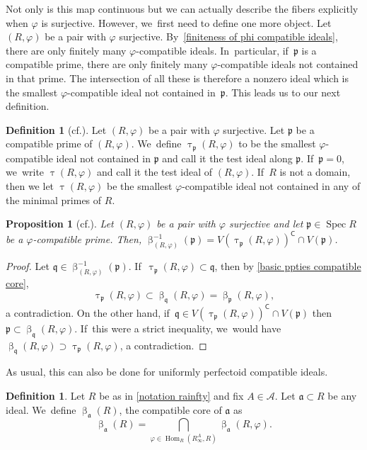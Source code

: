 \documentclass[11pt]{article}
\newcommand{\cf}{cf.\xspace}
\let\autoref\cref
\theoremstyle{plain}
\newtheorem{proposition}[theorem]{Proposition}
\theoremstyle{definition}
\newtheorem{definition}[theorem]{Definition}
\numberwithin{equation}{theorem}
\newcommand{\fra}{\mathfrak{a}}
\newcommand{\p}{\mathfrak{p}}
\newcommand{\q}{\mathfrak{q}}
\DeclareMathOperator{\Hom}{Hom}
\DeclareMathOperator{\Spec}{{Spec}}
\newcommand{\sA}{\mathcal{A}}
\renewcommand{\phi}{\varphi}
\newcommand{\rphi}{(R,\phi)}
\newcommand{\inv}{^{-1}}
\newcommand{\rafty}{R^A_\infty}
\begin{document}
Not only is this map continuous but we can actually describe the fibers explicitly when $\phi$ is surjective. However, we~first need to define one more object.
Let $\rphi$ be a pair with $\phi$ surjective. By~\autoref{finiteness of phi compatible ideals}, there are only finitely many $\phi$-compatible ideals. In~particular, if~$\p$ is a compatible prime, there are only finitely many $\phi$-compatible ideals not contained in that prime. The intersection of all these is therefore a nonzero ideal which is the smallest $\phi$-compatible ideal not contained in~$\p$. This leads us to our next definition.

\begin{definition}[{\cf \cite{TakagiHigherDimensionalAdjoint, SmolkinSubadditivity}}]
Let $\rphi$ be a pair with $\phi$ surjective. Let $\p$ be a compatible prime of $\rphi$. We~define $\uptau_\p\rphi$ to be the smallest $\phi$-compatible ideal not contained in $\p$ and call it the test ideal along $\p$. If~$\p=0$, we~write $\uptau\rphi$ and call it the test ideal of $\rphi$. If~$R$ is not a domain, then we let $\uptau\rphi$ be the smallest $\phi$-compatible ideal not contained in any of the minimal primes of $R$.
\end{definition}

\begin{proposition}[{\cf \cite[Prop.\,4.20]{CarvajalFayolleTameRamificationCFPS}}]\label{beta is locally closed}
Let $\rphi$ be a pair with $\phi$ surjective and let $\p\in \Spec R$ be a $\phi$-compatible prime. Then, $\upbeta\inv_{\rphi}(\p)=V(\uptau_\p\rphi)^\mathsf{C}\cap V(\p)$.
\end{proposition}

\begin{proof}
Let $\q\in \upbeta\inv_{\rphi}(\p)$. If~$\uptau_\p\rphi\subset \q$, then by \autoref{basic ppties compatible core},
\[\uptau_\p\rphi\subset \upbeta_\q\rphi=\upbeta_\p\rphi,\]
a contradiction. On the other hand, if~$\q\in V(\uptau_\p\rphi)^\mathsf{C} \cap V(\p)$ then $\p\subset \upbeta_\q\rphi$. If~this were a strict inequality, we~would have $\upbeta_\q\rphi\supset \uptau_\p\rphi$, a contradiction.
\end{proof}

As usual, this can also be done for uniformly perfectoid compatible ideals.

\begin{definition}
Let $R$ be as in \autoref{notation rainfty} and fix $A\in \sA$. Let $\fra\subset R$ be any ideal. We~define $\upbeta_\fra(R)$, the compatible core of $\fra$ as
\[
\upbeta_\fra(R)=\bigcap_{\phi\in \Hom_R\left(\rafty,R\right)}
\upbeta_\fra\rphi.
\]
\end{definition}
\end{document}
